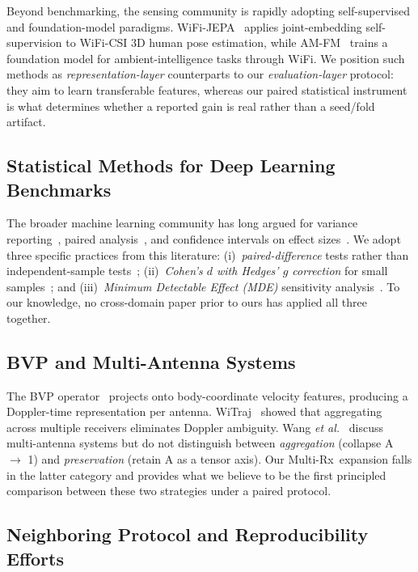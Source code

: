 \documentclass[11pt]{article}
\theoremstyle{definition}
\newcommand{\CSI}{\text{CSI}}
\newcommand{\MultiRx}{Multi-Rx}
\newcommand{\etal}{\textit{et al.}}
\begin{document}
Beyond benchmarking, the \CSI{} sensing community is rapidly adopting self-supervised and foundation-model paradigms. WiFi-JEPA~\cite{kim2026wifijepa} applies joint-embedding self-supervision to WiFi-CSI 3D human pose estimation, while AM-FM~\cite{zhu2026amfm} trains a foundation model for ambient-intelligence tasks through WiFi. We position such methods as \emph{representation-layer} counterparts to our \emph{evaluation-layer} protocol: they aim to learn transferable features, whereas our paired statistical instrument is what determines whether a reported gain is real rather than a seed/fold artifact.

\subsection{Statistical Methods for Deep Learning Benchmarks}

The broader machine learning community has long argued for variance reporting~\cite{henderson2018, bouthillier2021}, paired analysis~\cite{dror2018, colas2018}, and confidence intervals on effect sizes~\cite{bouthillier2021, dror2018}. We adopt three specific practices from this literature: (i)~\emph{paired-difference} tests rather than independent-sample tests~\cite{colas2018}; (ii)~\emph{Cohen's $d$ with Hedges' $g$ correction} for small samples~\cite{dror2018}; and (iii)~\emph{Minimum Detectable Effect (MDE)} sensitivity analysis~\cite{dror2018, pineau2021}. To our knowledge, no \CSI{} cross-domain paper prior to ours has applied all three together.

\subsection{BVP and Multi-Antenna Systems}

The BVP operator~\cite{zheng2019widar} projects \CSI{} onto body-coordinate velocity features, producing a Doppler-time representation per antenna. WiTraj~\cite{wu2021} showed that aggregating across multiple receivers eliminates Doppler ambiguity. Wang \etal~\cite{wang2026survey} discuss multi-antenna systems but do not distinguish between \emph{aggregation} (collapse A $\to$ 1) and \emph{preservation} (retain A as a tensor axis). Our \MultiRx\ expansion falls in the latter category and provides what we believe to be the first principled comparison between these two strategies under a paired protocol.

\subsection{Neighboring Protocol and Reproducibility Efforts}
\label{sec:related-neighbors}
\end{document}
